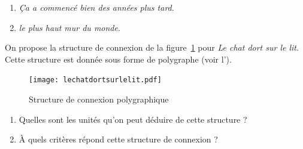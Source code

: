 {    \begin{enumerate}[label=(\arabic*)]
    \item \textit{Ça a commencé bien des années plus tard}.
    \item \textit{le plus haut mur du monde}.
    \end{enumerate}
     On propose la structure de connexion de la figure~\ref{fig:lechat} pour \textit{Le chat dort sur le lit}. Cette structure est donnée sous forme de polygraphe (voir l').

\begin{figure}[H]
    \begin{center}
    \texttt{[image: lechatdortsurlelit.pdf]}
    \end{center}
\caption{Structure de connexion polygraphique\label{fig:lechat}}
\end{figure}

    
    \begin{enumerate}[label=\alph*.]
    \item Quelles sont les unités qu’on peut déduire de cette structure ?
    \item À quels critères répond cette structure de connexion ?
    \end{enumerate} 
}
